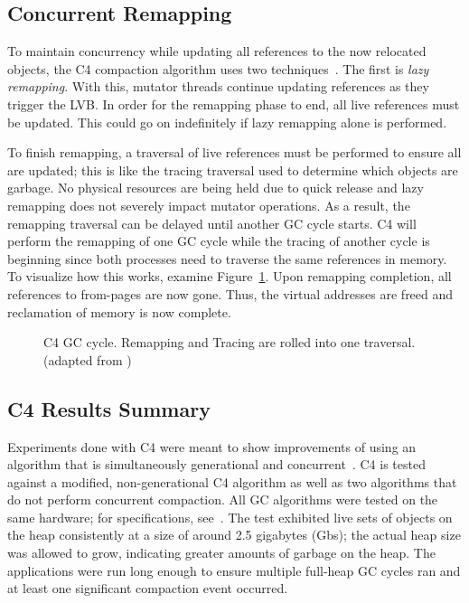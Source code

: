 \documentclass{sig-alternate}
\begin{document}
\subsection{Concurrent Remapping}
\label{sec:c4Remapping}

To maintain concurrency while updating all references to the now relocated
objects, the C4 compaction algorithm uses two techniques~\cite{Tene:C4}. The first is
\emph{lazy remapping}. With this, mutator
threads continue updating references as they trigger the LVB. In order for
the remapping phase to end, all live references must be updated.
This could go on indefinitely if lazy remapping alone is performed.

To finish remapping, a traversal of live references must be performed to
ensure all are updated; this is like the tracing traversal used to determine which
objects are garbage. No physical resources are being held due
to quick release and lazy remapping does not severely impact mutator operations. 
As a result, the remapping traversal can be delayed until another GC cycle starts.
C4 will perform the remapping of one GC cycle while the tracing
of another cycle is beginning since both processes need to traverse
the same references in memory. To
visualize how this works, examine Figure~\ref{fig:c4Cycle}. Upon remapping completion, 
all references to from-pages are now gone. Thus, the virtual addresses
are freed and reclamation of memory is now complete. 

\begin{figure}
\centering
{}
\caption{C4 GC cycle. Remapping and Tracing are rolled into one traversal.
(adapted from \cite{Tene:C4})}
\label{fig:c4Cycle}
\end{figure}


\subsection{C4 Results Summary}
\label{sec:c4Results}


Experiments done with C4 were meant to show improvements
of using an algorithm that is simultaneously generational and concurrent~\cite{Tene:C4}.
C4 is tested against a modified, non-generational C4 algorithm as well as
two algorithms that do not perform concurrent compaction. 
All GC algorithms were tested on the same hardware; for specifications, see~\cite{Tene:C4}. 
The test exhibited live sets of objects on 
the heap consistently at a size of around 2.5 gigabytes (Gbs); the actual heap size was allowed 
to grow, indicating greater amounts of garbage on the heap. The applications were run long
enough to ensure multiple full-heap GC cycles ran and at least one
significant compaction event occurred.
\end{document}
